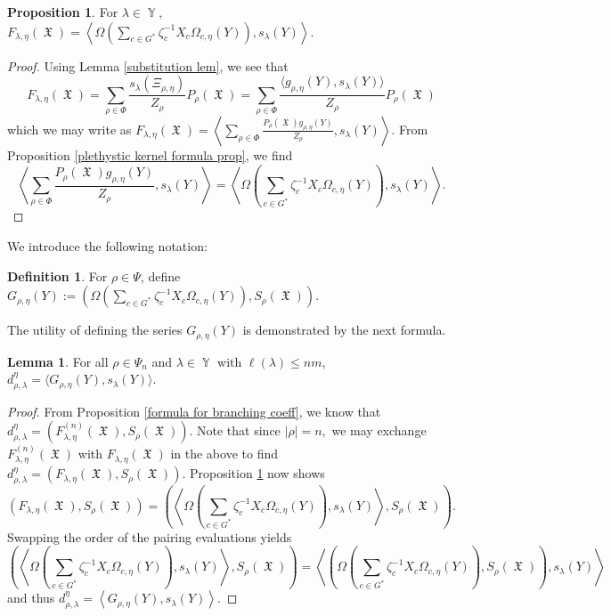 \documentclass[12pt,reqno]{amsart}
\theoremstyle{definition}
\newtheorem{lem}[thm]{Lemma}
\newtheorem{prop}[thm]{Proposition}
\newtheorem{defn}[thm]{Definition}
\DeclareMathOperator{\Par}{\mathbb{Y}}
\DeclareMathOperator{\fX}{\mathfrak{X}}
\begin{document}
\begin{prop}\label{restriction character formula prop}
For $\lambda \in \Par,$
    $F_{\lambda,\eta}(\fX) = \left\langle \Omega\left( \sum_{c \in G^*} \zeta_c^{-1} X_{c} \Omega_{c,\eta}(Y) \right), s_{\lambda}(Y) \right\rangle .$
\end{prop}
\begin{proof}
Using Lemma \ref{substitution lem}, we see that
$$F_{\lambda,\eta}(\fX) = \sum_{\rho \in \Phi} \frac{s_{\lambda}(\Xi_{\rho,\eta})}{Z_{\rho}} P_{\rho}(\fX) = \sum_{\rho \in \Phi} \frac{\langle g_{\rho,\eta}(Y), s_{\lambda}(Y) \rangle}{Z_{\rho}} P_{\rho}(\fX)$$ which we may write as 
$F_{\lambda,\eta}(\fX) =  \left\langle \sum_{\rho \in \Phi} \frac{P_{\rho}(\fX)g_{\rho,\eta}(Y)}{Z_{\rho}} , s_{\lambda}(Y) \right\rangle.$ From Proposition \ref{plethystic kernel formula prop}, we find
$$\left\langle \sum_{\rho \in \Phi} \frac{P_{\rho}(\fX)g_{\rho,\eta}(Y)}{Z_{\rho}} , s_{\lambda}(Y) \right\rangle = \left\langle \Omega\left( \sum_{c \in G^*} \zeta_c^{-1} X_{c} \Omega_{c,\eta}(Y) \right) , s_{\lambda}(Y) \right\rangle.$$


\end{proof}

We introduce the following notation:

\begin{defn}\label{G def}
For $\rho \in \Psi$, define
    $G_{\rho,\eta}(Y):= \left( \Omega\left( \sum_{c \in G^*} \zeta_c^{-1} X_{c} \Omega_{c,\eta}(Y)   \right) , S_{\rho}(\fX) \right).$
\end{defn}

The utility of defining the series $G_{\rho,\eta}(Y)$ is demonstrated by the next formula.


\begin{lem}\label{branching coeff lem 2}
For all $\rho \in \Psi_n$ and $\lambda \in \Par$ with $\ell(\lambda) \leq nm$,
    $d_{\rho,\lambda}^{\eta} = \langle G_{\rho,\eta}(Y), s_{\lambda}(Y) \rangle.$
\end{lem}
\begin{proof}
    From Proposition \ref{formula for branching coeff}, we know that 
    $d_{\rho,\lambda}^{\eta} = \left( F_{\lambda,\eta}^{(n)}(\fX), S_{\rho}(\fX) \right).$ Note that since $|\rho| = n,$ we may exchange $F_{\lambda,\eta}^{(n)}(\fX)$ with $F_{\lambda,\eta}(\fX)$ in the above to find 
    $d_{\rho,\lambda}^{\eta} = \left( F_{\lambda,\eta}(\fX), S_{\rho}(\fX) \right).$ Proposition \ref{restriction character formula prop} now shows 
    $$\left( F_{\lambda,\eta}(\fX), S_{\rho}(\fX) \right) = \left( \left\langle \Omega\left( \sum_{c \in G^*} \zeta_c^{-1} X_{c} \Omega_{c,\eta}(Y)   \right), s_{\lambda}(Y) \right\rangle, S_{\rho}(\fX) \right).$$ Swapping the order of the pairing evaluations yields
    $$\left( \left\langle \Omega\left( \sum_{c \in G^*} \zeta_c^{-1} X_{c} \Omega_{c,\eta}(Y)   \right), s_{\lambda}(Y) \right\rangle, S_{\rho}(\fX) \right) = \left\langle \left( \Omega\left( \sum_{c \in G^*} \zeta_c^{-1} X_{c} \Omega_{c,\eta}(Y)   \right), S_{\rho}(\fX)  \right), s_{\lambda}(Y) \right\rangle$$ and thus
    $ d_{\rho,\lambda}^{\eta} = \left\langle G_{\rho,\eta}(Y) , s_{\lambda}(Y)   \right\rangle.$
\end{proof}
\end{document}
